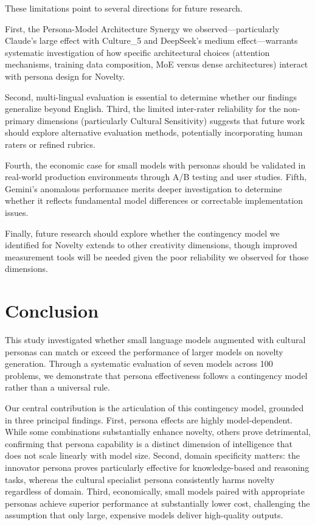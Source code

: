 \documentclass{article}
\begin{document}
These limitations point to several directions for future research.

First, the Persona-Model Architecture Synergy we observed—particularly Claude's large effect with Culture\_5 and DeepSeek's medium effect—warrants systematic investigation of how specific architectural choices (attention mechanisms, training data composition, MoE versus dense architectures) interact with persona design for Novelty.

Second, multi-lingual evaluation is essential to determine whether our findings generalize beyond English. Third, the limited inter-rater reliability for the non-primary dimensions (particularly Cultural Sensitivity) suggests that future work should explore alternative evaluation methods, potentially incorporating human raters or refined rubrics.

Fourth, the economic case for small models with personas should be validated in real-world production environments through A/B testing and user studies. Fifth, Gemini's anomalous performance merits deeper investigation to determine whether it reflects fundamental model differences or correctable implementation issues.

Finally, future research should explore whether the contingency model we identified for Novelty extends to other creativity dimensions, though improved measurement tools will be needed given the poor reliability we observed for those dimensions.


\section{Conclusion}

This study investigated whether small language models augmented with cultural personas can match or exceed the performance of larger models on novelty generation. Through a systematic evaluation of seven models across 100 problems, we demonstrate that persona effectiveness follows a contingency model rather than a universal rule.

Our central contribution is the articulation of this contingency model, grounded in three principal findings. First, persona effects are highly model-dependent. While some combinations substantially enhance novelty, others prove detrimental, confirming that persona capability is a distinct dimension of intelligence that does not scale linearly with model size. Second, domain specificity matters: the innovator persona proves particularly effective for knowledge-based and reasoning tasks, whereas the cultural specialist persona consistently harms novelty regardless of domain. Third, economically, small models paired with appropriate personas achieve superior performance at substantially lower cost, challenging the assumption that only large, expensive models deliver high-quality outputs.
\end{document}
